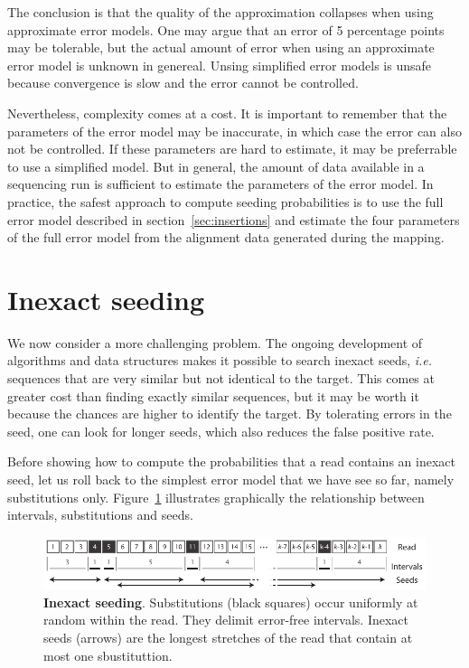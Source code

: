 \documentclass{article}
\begin{document}
The conclusion is that the quality of the approximation collapses when
using approximate error models. One may argue that an error of 5
percentage points may be tolerable, but the actual amount of error when
using an approximate error model is unknown in genereal. Unsing simplified
error models is unsafe because convergence is slow and the error cannot be
controlled.

Nevertheless, complexity comes at a cost. It is important to remember that
the parameters of the error model may be inaccurate, in which case the
error can also not be controlled. If these parameters are hard to
estimate, it may be preferrable to use a simplified model. But in general,
the amount of data available in a sequencing run is sufficient to estimate
the parameters of the error model. In practice, the safest approach to
compute seeding probabilities is to use the full error model described in
section~\ref{sec:insertions} and estimate the four parameters of the full
error model from the alignment data generated during the mapping.








\section{Inexact seeding}

We now consider a more challenging problem. The ongoing development of
algorithms and data structures makes it possible to search inexact seeds,
\textit{i.e.} sequences that are very similar but not identical to the
target. This comes at greater cost than finding exactly similar sequences,
but it may be worth it because the chances are higher to identify the
target. By tolerating errors in the seed, one can look for longer seeds,
which also reduces the false positive rate.

Before showing how to compute the probabilities that a read contains
an inexact seed, let us roll back to the simplest error model that we have
see so far, namely substitutions only. Figure~\ref{fig:sketchinexact}
illustrates graphically the relationship between intervals, substitutions
and seeds.

\begin{figure}[h]
\centering
\includegraphics[scale=0.88]{sketch_inexact_seeding.pdf}
\caption{\textbf{Inexact seeding}. Substitutions (black squares) occur
uniformly at random within the read. They delimit error-free intervals.
Inexact seeds (arrows) are the longest stretches of the read that contain
at most one sbustituttion.}
\label{fig:sketchinexact}
\end{figure}
\end{document}
